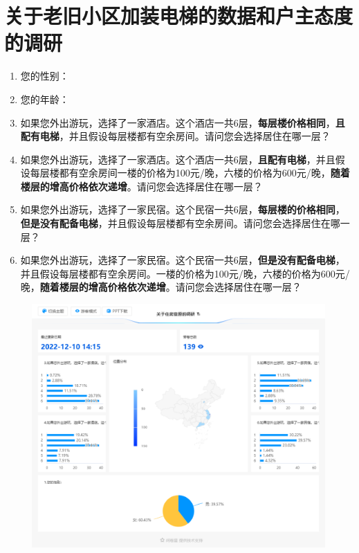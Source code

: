 \documentclass[lang=cn,a4paper]{elegantpaper}
\begin{document}
    \section{关于老旧小区加装电梯的数据和户主态度的调研}
    \begin{enumerate}[1.~~]
        \item 您的性别：
        \item 您的年龄：
        \item 如果您外出游玩，选择了一家酒店。这个酒店一共6层，\textbf{每层楼价格相同}，\textbf{且配有电梯}，并且假设每层楼都有空余房间。请问您会选择居住在哪一层？
        \item 如果您外出游玩，选择了一家酒店。这个酒店一共6层，\textbf{且配有电梯}，并且假设每层楼都有空余房间一楼的价格为100元/晚，六楼的价格为600元/晚，\textbf{随着楼层的增高价格依次递增}。请问您会选择居住在哪一层？ 
        \item 如果您外出游玩，选择了一家民宿。这个民宿一共6层，\textbf{每层楼的价格相同}，\textbf{但是没有配备电梯}，并且假设每层楼都有空余房间。请问您会选择居住在哪一层？
        \item 如果您外出游玩，选择了一家民宿。这个民宿一共6层，\textbf{但是没有配备电梯}，并且假设每层楼都有空余房间。一楼的价格为100元/晚，六楼的价格为600元/晚，\textbf{随着楼层的增高价格依次递增}。请问您会选择居住在哪一层？
    \end{enumerate}
    \begin{figure}[H]
        \centering
        \includegraphics[scale=0.43]{questionnaire.png}
    \end{figure}
\end{document}
